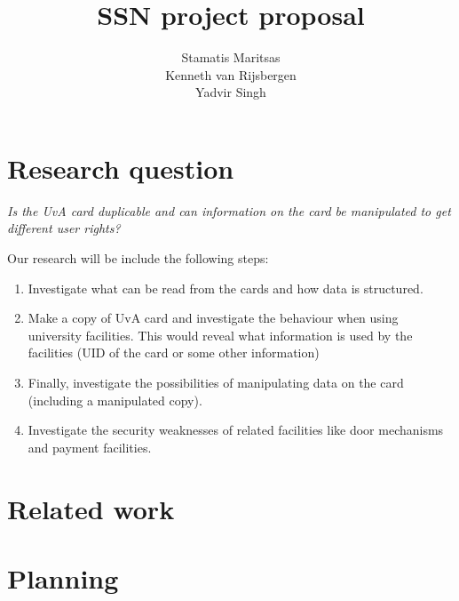 \documentclass[11pt]{article}
\title{\textbf{SSN project proposal}}
\author{Stamatis Maritsas\\
		Kenneth van Rijsbergen\\
		Yadvir Singh}
\date{}
\begin{document}
\maketitle


\section{Research question}


\begin{framed}
\noindent \textit{Is the UvA card duplicable and can information on the card be manipulated to get different user rights?}
\end{framed}
Our research will be include the following steps:

\begin{enumerate}
\item{Investigate what can be read from the cards and how data is structured.}
\item{Make a copy of UvA card and investigate the behaviour when using university facilities. This would
reveal what information is used by the facilities (UID of the card or some other information)}
\item{Finally, investigate the possibilities of manipulating data on the card (including a manipulated copy).}
\item{Investigate the security weaknesses of related facilities like door mechanisms and payment facilities.}
\end{enumerate}

\clearpage



\section{Related work}


\section{Planning}
\end{document}
